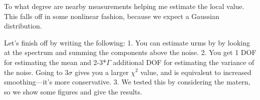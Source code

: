 \documentclass[twocol]{ametsoc}
\begin{document}
To what degree are nearby measurements helping me estimate the local value. This falls off in some nonlinear fashion, because we expect a Gaussian distribution.

Let's finish off by writing the following:
1. You can estimate urms by by looking at the spectrum and summing the components above the noise.
2. You get 1 DOF for estimating the mean and 2-3*$\Gamma$ additional DOF for estimating the variance of the noise. Going to $3 \sigma$ gives you a larger $\chi^2$ value, and is equivalent to increased smoothing---it's more conservative.
3. We tested this by considering the matern, so we show some figures and give the results.




%
%
%
%
%
%
\end{document}
